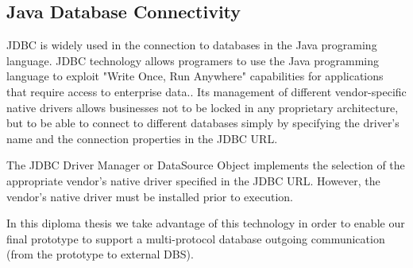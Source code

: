 \subsection{Java Database Connectivity}

\ac{JDBC} is widely used in the connection to databases in the Java programing language. JDBC technology allows programers to use the Java programming language to exploit "Write Once, Run Anywhere" capabilities for applications that require access to enterprise data.\cite{jdbcspec}. Its management of different vendor-specific native drivers allows businesses not to be locked in any proprietary architecture, but to be able to connect to different databases simply by specifying the driver's name and the connection properties in the \ac{JDBC} URL. 

The \ac{JDBC} Driver Manager or DataSource Object implements the selection of the appropriate vendor's native driver specified in the \ac{JDBC} URL. However, the vendor's native driver must be installed prior to execution. 

In this diploma thesis we take advantage of this technology in order to enable our final prototype to support a multi-protocol database outgoing communication (from the prototype to external \ac{DBS}).  


\FloatBarrier
